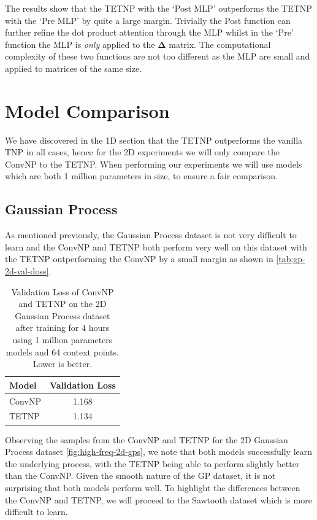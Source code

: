 \documentclass[../../main.tex]{subfiles}
\begin{document}
The results show that the TETNP with the `Post MLP' outperforms the TETNP with the `Pre MLP' by quite a large margin. Trivially the Post function can further refine the dot product attention through the MLP whilst in the `Pre' function the MLP is \emph{only} applied to the $\bm{\Delta}$ matrix. The computational complexity of these two functions are not too different as the MLP are small and applied to matrices of the same size.

\section{Model Comparison}

We have discovered in the 1D section that the TETNP outperforms the vanilla TNP in all cases, hence for the 2D experiments we will only compare the ConvNP to the TETNP. When performing our experiments we will use models which are both 1 million parameters in size, to ensure a fair comparison.

\subsection{Gaussian Process}

As mentioned previously, the Gaussian Process dataset is not very difficult to learn and the ConvNP and TETNP both perform very well on this dataset with the TETNP outperforming the ConvNP by a small margin as shown in \autoref{tab:gp-2d-val-doss}.

\begin{table}[ht]
    \centering
    \begin{tabular}{lc}
        \toprule
        Model  & Validation Loss \\
        \midrule
        ConvNP & 1.168           \\
        TETNP  & 1.134           \\
        \bottomrule
    \end{tabular}
    \caption{Validation Loss of ConvNP and TETNP on the 2D Gaussian Process dataset after training for 4 hours using 1 million parameters models and 64 context points. Lower is better.}
    \label{tab:gp-2d-val-doss}
\end{table}

Observing the samples from the ConvNP and TETNP for the 2D Gaussian Process dataset \autoref{fig:high-freq-2d-gps}, we note that both models successfully  learn the underlying process, with the TETNP being able to perform slightly better than the ConvNP. Given the smooth nature of the GP dataset, it is not surprising that both models perform well. To highlight the differences between the ConvNP and TETNP, we will proceed to the Sawtooth dataset which is more difficult to learn.
\end{document}

